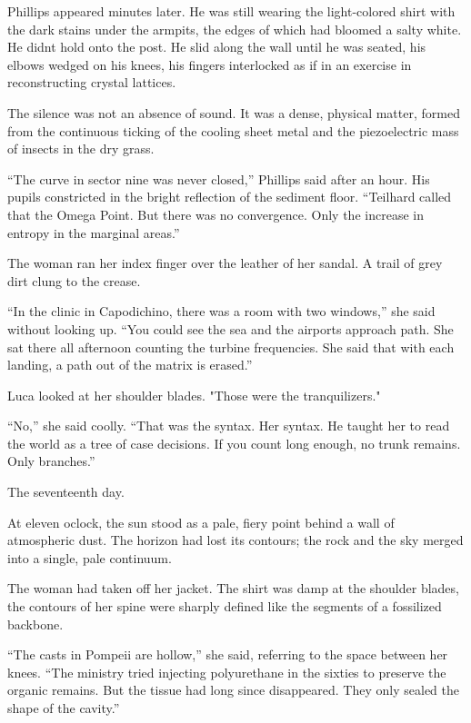 \documentclass[
  ngerman,
]{article}
\begin{document}
Phillips appeared minutes later. He was still wearing the light-colored
shirt with the dark stains under the armpits, the edges of which had
bloomed a salty white. He didn\textquotesingle t hold onto the post. He
slid along the wall until he was seated, his elbows wedged on his knees,
his fingers interlocked as if in an exercise in reconstructing crystal
lattices.

The silence was not an absence of sound. It was a dense, physical
matter, formed from the continuous ticking of the cooling sheet metal
and the piezoelectric mass of insects in the dry grass.

``The curve in sector nine was never closed,'' Phillips said after an
hour. His pupils constricted in the bright reflection of the sediment
floor. ``Teilhard called that the Omega Point. But there was no
convergence. Only the increase in entropy in the marginal areas.''

The woman ran her index finger over the leather of her sandal. A trail
of grey dirt clung to the crease.

``In the clinic in Capodichino, there was a room with two windows,'' she
said without looking up. ``You could see the sea and the
airport\textquotesingle s approach path. She sat there all afternoon
counting the turbine frequencies. She said that with each landing, a
path out of the matrix is \hspace{0pt}\hspace{0pt}erased.''

Luca looked at her shoulder blades. "Those were the tranquilizers."

``No,'' she said coolly. ``That was the syntax. Her syntax. He taught
her to read the world as a tree of case decisions. If you count long
enough, no trunk remains. Only branches.''

The seventeenth day.

At eleven o\textquotesingle clock, the sun stood as a pale, fiery point
behind a wall of atmospheric dust. The horizon had lost its contours;
the rock and the sky merged into a single, pale continuum.

The woman had taken off her jacket. The shirt was damp at the shoulder
blades, the contours of her spine were sharply defined like the segments
of a fossilized backbone.

``The casts in Pompeii are hollow,'' she said, referring to the space
between her knees. ``The ministry tried injecting polyurethane in the
sixties to preserve the organic remains. But the tissue had long since
disappeared. They only sealed the shape of the cavity.''
\end{document}
